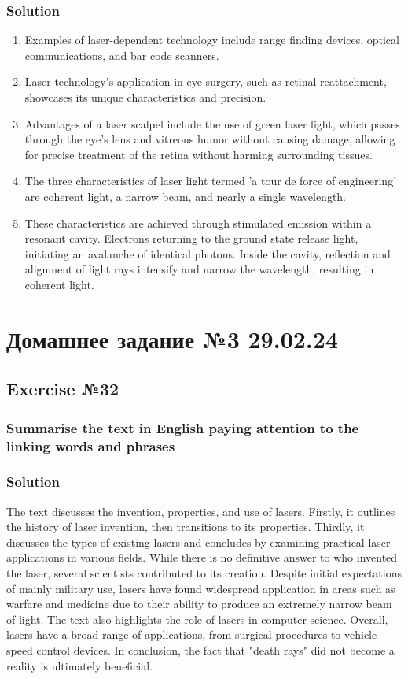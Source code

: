 \subsection*{Solution}
\begin{enumerate}
      \item Examples of laser-dependent technology include range finding devices, optical communications, and bar code scanners.
      \item Laser technology's application in eye surgery, such as retinal reattachment, showcases its unique characteristics and precision.
      \item Advantages of a laser scalpel include the use of green laser light, which passes through the eye's lens and vitreous humor without causing damage, allowing for precise treatment of the retina without harming surrounding tissues.
      \item The three characteristics of laser light termed 'a tour de force of engineering' are coherent light, a narrow beam, and nearly a single wavelength.
      \item These characteristics are achieved through stimulated emission within a resonant cavity. Electrons returning to the ground state release light, initiating an avalanche of identical photons. Inside the cavity, reflection and alignment of light rays intensify and narrow the wavelength, resulting in coherent light.
\end{enumerate}

\chapter{Домашнее задание №3 29.02.24}

\section{Exercise №32}
\subsection*{Summarise the text in English paying attention to the linking words and
      phrases}

\subsection*{Solution}
The text discusses the invention, properties, and use of lasers. Firstly, it outlines
the history of laser invention, then transitions to its properties. Thirdly, it
discusses the types of existing lasers and concludes by examining practical laser
applications in various fields. While there is no definitive answer to who invented
the laser, several scientists contributed to its creation. Despite initial expectations
of mainly military use, lasers have found widespread application in areas such as
warfare and medicine due to their ability to produce an extremely narrow beam of
light. The text also highlights the role of lasers in computer science. Overall,
lasers have a broad range of applications, from surgical procedures to vehicle speed
control devices. In conclusion, the fact that "death rays" did not become a reality
is ultimately beneficial.


